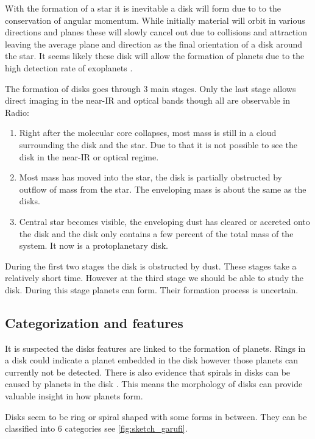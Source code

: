With the formation of a star it is inevitable a disk will form due to to the conservation of angular momentum. While initially material will orbit in various directions and planes these will slowly cancel out due to collisions and attraction leaving the average plane and direction as the final orientation of a disk around the star. It seems likely these disk will allow the formation of planets due to the high detection rate of exoplanets \cite{williams}.

The formation of disks goes through 3 main stages\cite{williams}. Only the last stage allows direct imaging in the near-IR and optical bands though all are observable in Radio:

\begin{enumerate}
  \item Right after the molecular core collapses, most mass is still in a cloud surrounding the disk and the star. Due to that it is not possible to see the disk in the near-IR  or optical regime.
  \item Most mass has moved into the star, the disk is partially obstructed by outflow of mass from the star. The enveloping mass is about the same as the disks.
  \item Central star becomes visible, the enveloping dust has cleared or accreted onto the disk and the disk only contains a few percent of the total mass of the system. It now is a protoplanetary disk.
\end{enumerate}

During the first two stages the disk is obstructed by dust. These stages take a relatively short time. However at the third stage we should be able to study the disk. During this stage planets can form. Their formation process is uncertain. 

\subsection{Categorization and features}

It is suspected the disks features are linked to the formation of planets. Rings in a disk could indicate a planet embedded in the disk \cite{rings} however those planets can currently not be detected. There is also evidence that spirals in disks can be caused by planets in the disk \cite{garufi}. This means the morphology of disks can provide valuable insight in how planets form.

Disks seem to be ring or spiral shaped with some forms in between. They can be classified into 6 categories \cite{garufi} see \autoref{fig:sketch_garufi}. 

